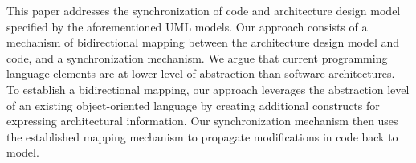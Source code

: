 This paper addresses the synchronization of code and architecture design model specified by the aforementioned UML models. %
Our approach consists of a mechanism of bidirectional mapping between the architecture design model and code, and a synchronization mechanism. 
We argue that current programming language elements are at lower level of abstraction than software architectures.
To establish a bidirectional mapping, our approach leverages the abstraction level of an existing object-oriented language by creating additional constructs for expressing architectural information.
Our synchronization mechanism then uses the established mapping mechanism to propagate modifications in code back to model.


